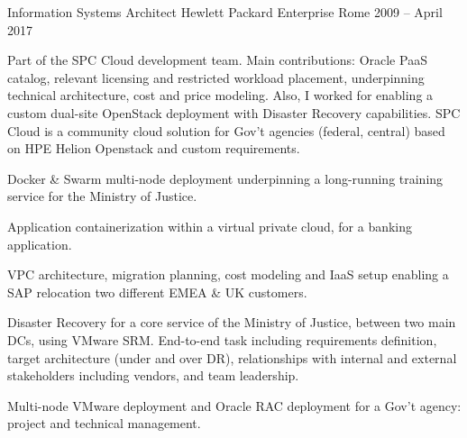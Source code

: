 \begin{cventries}

  \cventry
    {Information Systems Architect} %
    {Hewlett Packard Enterprise} %
    {Rome} %
    {2009 -- April 2017} %
    {
      \begin{cvitems} %
        \item {Part of the SPC Cloud development team. Main contributions: Oracle PaaS catalog, relevant licensing and restricted workload placement, underpinning technical architecture, cost and price modeling. Also, I worked for enabling a custom dual-site OpenStack deployment with Disaster Recovery capabilities. SPC Cloud is a community cloud solution for Gov't agencies (federal, central) based on HPE Helion Openstack and custom requirements.}
        \item {Docker \& Swarm multi-node deployment underpinning a long-running training service for the Ministry of Justice.}
        \item {Application containerization within a virtual private cloud, for a banking application.}
        \item {VPC architecture, migration planning, cost modeling and IaaS setup enabling a SAP relocation two different EMEA \& UK customers.}
        \item {Disaster Recovery for a core service of the Ministry of Justice, between two main DCs, using VMware SRM. End-to-end task including requirements definition, target architecture (under and over DR), relationships with internal and external stakeholders including vendors, and team leadership.}
        \item {Multi-node VMware deployment and Oracle RAC deployment for a Gov't agency: project and technical management.}
      \end{cvitems}
    }



\end{cventries}
